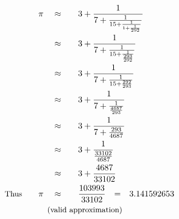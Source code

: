 \begin{alignat*}{5}
&\,&\pi\quad&\approx\quad&&3+\frac{1}{7+\frac{1}{15+\frac{1}{1+\frac{1}{292}}}}\\
&\,&\,&\approx\quad&&3+\frac{1}{7+\frac{1}{15+\frac{1}{\frac{293}{292}}}}\\
&\,&\,&\approx\quad&&3+\frac{1}{7+\frac{1}{15+\frac{292}{293}}}\\
&\,&\,&\approx\quad&&3+\frac{1}{7+\frac{1}{\frac{4687}{293}}}\\
&\,&\,&\approx\quad&&3+\frac{1}{7+\frac{293}{4687}}\\
&\,&\,&\approx\quad&&3+\frac{1}{\frac{33102}{4687}}\\
&\,&\,&\approx\quad&&3+\frac{4687}{33102}\\
&\small\text{Thus}\quad&\pi\quad&\approx\quad&&\frac{103993}{33102}\rlap{\quad=\quad3.141592653}\\
&\rlap{\qquad\qquad\quad\small\text{(valid approximation)}}
\end{alignat*}
